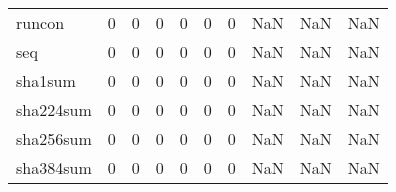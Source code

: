 \begin{longtable}{lrrrrrrrrr}
runcon    &                                       0 &                                                  0 &                                                  0 &                                                  0 &                                                  0 &                                                  0 &                                                NaN &                                    NaN &                                  NaN \\
seq       &                                       0 &                                                  0 &                                                  0 &                                                  0 &                                                  0 &                                                  0 &                                                NaN &                                    NaN &                                  NaN \\
sha1sum   &                                       0 &                                                  0 &                                                  0 &                                                  0 &                                                  0 &                                                  0 &                                                NaN &                                    NaN &                                  NaN \\
sha224sum &                                       0 &                                                  0 &                                                  0 &                                                  0 &                                                  0 &                                                  0 &                                                NaN &                                    NaN &                                  NaN \\
sha256sum &                                       0 &                                                  0 &                                                  0 &                                                  0 &                                                  0 &                                                  0 &                                                NaN &                                    NaN &                                  NaN \\
sha384sum &                                       0 &                                                  0 &                                                  0 &                                                  0 &                                                  0 &                                                  0 &                                                NaN &                                    NaN &                                  NaN \\

\end{longtable}

